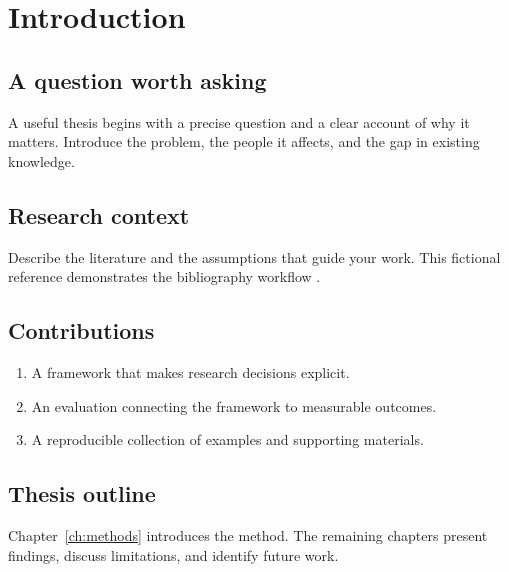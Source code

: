 \chapter{Introduction}\label{ch:introduction}
\section{A question worth asking}
A useful thesis begins with a precise question and a clear account of why it matters. Introduce the problem, the people it affects, and the gap in existing knowledge.
\section{Research context}
Describe the literature and the assumptions that guide your work. This fictional reference demonstrates the bibliography workflow \citep{morgan2026}.
\lipsum[2]
\section{Contributions}
\begin{enumerate}\item A framework that makes research decisions explicit.\item An evaluation connecting the framework to measurable outcomes.\item A reproducible collection of examples and supporting materials.\end{enumerate}
\section{Thesis outline}
Chapter~\ref{ch:methods} introduces the method. The remaining chapters present findings, discuss limitations, and identify future work.
